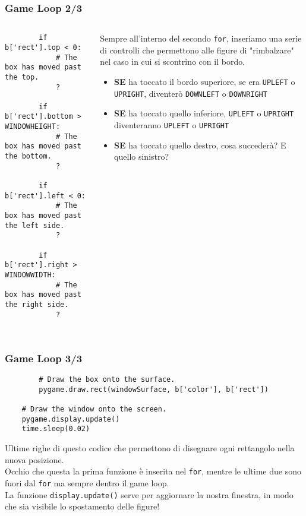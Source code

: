 \documentclass{beamer}
\begin{document}
\begin{frame}[fragile]
\frametitle{Game Loop 2/3}
\lstset{basicstyle=\tiny}
\begin{columns}
	\begin{column}[T]{0.5\textwidth}
		\begin{lstlisting}
        if b['rect'].top < 0:
            # The box has moved past the top.
            ?
		
        if b['rect'].bottom > WINDOWHEIGHT:
            # The box has moved past the bottom.
            ?
		
        if b['rect'].left < 0:
            # The box has moved past the left side.
            ?
		
        if b['rect'].right > WINDOWWIDTH:
            # The box has moved past the right side.
            ?
		
		\end{lstlisting}
	\end{column}
	\begin{column}[T]{0.5\textwidth}
		Sempre all'interno del secondo \texttt{for}, inseriamo una serie di controlli che permettono alle figure di "rimbalzare" nel caso in cui si scontrino con il bordo.\\
		\begin{itemize}
			\item \textbf{SE} ha toccato il bordo superiore, se era \texttt{UPLEFT} o \texttt{UPRIGHT}, diventerò \texttt{DOWNLEFT} o \texttt{DOWNRIGHT}
			\item \textbf{SE} ha toccato quello inferiore, \texttt{UPLEFT} o \texttt{UPRIGHT} diventeranno \texttt{UPLEFT} o \texttt{UPRIGHT}
			\item \textbf{SE} ha toccato quello destro, cosa succederà? E quello sinistro?
		\end{itemize}
		
	\end{column}
\end{columns}
\end{frame}


\begin{frame}[fragile]
\frametitle{Game Loop 3/3}
		\begin{lstlisting}
        # Draw the box onto the surface.
        pygame.draw.rect(windowSurface, b['color'], b['rect'])
		
    # Draw the window onto the screen.
    pygame.display.update()
    time.sleep(0.02)
		\end{lstlisting}
		Ultime righe di questo codice che permettono di disegnare ogni rettangolo nella nuova posizione. \\Occhio che questa la prima funzione è inserita nel \texttt{for}, mentre le ultime due sono fuori dal \texttt{for} ma sempre dentro il game loop.\\
		La funzione \texttt{display.update()} serve per aggiornare la nostra finestra, in modo che sia visibile lo spostamento delle figure!
\end{frame}
\end{document}
